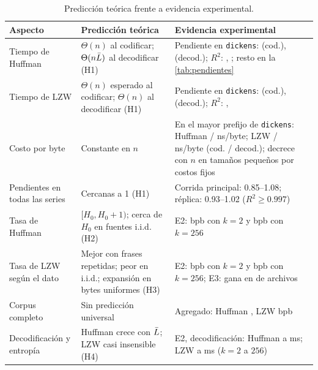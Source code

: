 \begin{table}[H]
  \centering
  \caption{Predicción teórica frente a evidencia experimental.}
  \label{tab:teoria-experimento}
  \small
  \renewcommand{\arraystretch}{1.15}
  \begin{tabular}{@{}>{\raggedright}p{3.0cm} >{\raggedright}p{5.2cm} >{\raggedright\arraybackslash}p{6.4cm}@{}}
    \toprule
    Aspecto & Predicción teórica & Evidencia experimental \\
    \midrule
    Tiempo de Huffman & $\Theta(n)$ al codificar; $\Theta(n\bar{L})$ al decodificar (H1) &
      Pendiente en \texttt{dickens}: \resSlopeDickensHuffEnc{} (cod.), \resSlopeDickensHuffDec{}
      (decod.); $R^2$: \resRtwoDickensHuffEnc{}, \resRtwoDickensHuffDec{}; resto en la
      \cref{tab:pendientes} \\
    Tiempo de LZW & $\Theta(n)$ esperado al codificar; $\Theta(n)$ al decodificar (H1) &
      Pendiente en \texttt{dickens}: \resSlopeDickensLzwEnc{} (cod.), \resSlopeDickensLzwDec{}
      (decod.); $R^2$: \resRtwoDickensLzwEnc{}, \resRtwoDickensLzwDec{} \\
    Costo por byte & Constante en $n$ & En el mayor prefijo de \texttt{dickens}: Huffman
      \resNspbDickensHuffEnc{} / \resNspbDickensHuffDec{} ns/byte; LZW
      \resNspbDickensLzwEnc{} / \resNspbDickensLzwDec{} ns/byte (cod. / decod.); decrece con $n$
      en tamaños pequeños por costos fijos \\
    Pendientes en todas las series & Cercanas a 1 (H1) &
      Corrida principal: 0.85--1.08; réplica: 0.93--1.02 ($R^2 \ge 0.997$) \\
    Tasa de Huffman & $[H_0, H_0 + 1)$; cerca de $H_0$ en fuentes i.i.d. (H2) &
      E2: \resEntropyHuffBpbKTwo{} bpb con $k = 2$ y \resEntropyHuffBpbKTwoFiftySix{} bpb con
      $k = 256$ \\
    Tasa de LZW según el dato & Mejor con frases repetidas; peor en i.i.d.; expansión en
      bytes uniformes (H3) &
      E2: \resEntropyLzwBpbKTwo{} bpb con $k = 2$ y \resEntropyLzwBpbKTwoFiftySix{} bpb con
      $k = 256$; E3: gana en \resLzwWins{} de \resCorpusFiles{} archivos \\
    Corpus completo & Sin predicción universal &
      Agregado: Huffman \resCorpusHuffBpb{}, LZW \resCorpusLzwBpb{} bpb \\
    Decodificación y entropía & Huffman crece con $\bar{L}$; LZW casi insensible (H4) &
      E2, decodificación: Huffman \resEntropyHuffDecMsKTwo{} a
      \resEntropyHuffDecMsKTwoFiftySix{} ms; LZW \resEntropyLzwDecMsKTwo{} a
      \resEntropyLzwDecMsKTwoFiftySix{} ms ($k = 2$ a $256$) \\
    \bottomrule
  \end{tabular}
\end{table}

